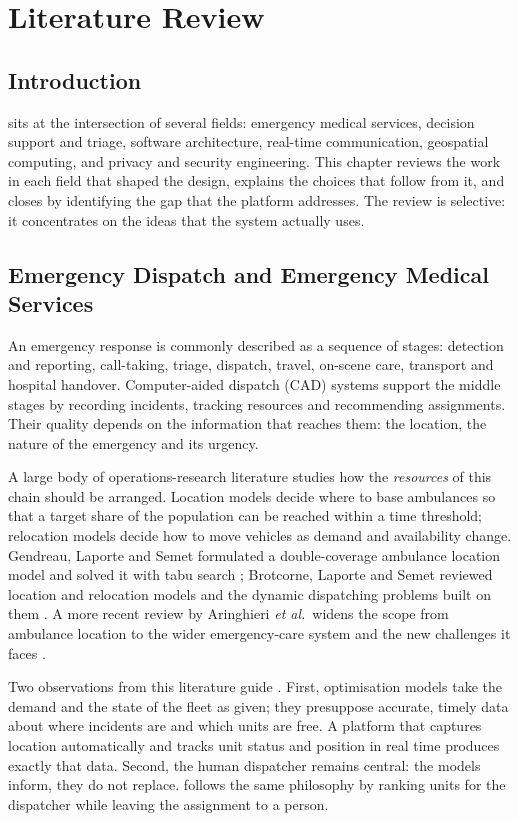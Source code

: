 \chapter{Literature Review}\label{chap:literature}

\section{Introduction}

\ProjectName{} sits at the intersection of several fields: emergency medical services, decision support and
triage, software architecture, real-time communication, geospatial computing, and privacy and security
engineering. This chapter reviews the work in each field that shaped the design, explains the choices that follow
from it, and closes by identifying the gap that the platform addresses. The review is selective: it concentrates
on the ideas that the system actually uses.

\section{Emergency Dispatch and Emergency Medical Services}

An emergency response is commonly described as a sequence of stages: detection and reporting, call-taking,
triage, dispatch, travel, on-scene care, transport and hospital handover. Computer-aided dispatch (CAD) systems
support the middle stages by recording incidents, tracking resources and recommending assignments. Their
quality depends on the information that reaches them: the location, the nature of the emergency and its urgency.

A large body of operations-research literature studies how the \emph{resources} of this chain should be
arranged. Location models decide where to base ambulances so that a target share of the population can be
reached within a time threshold; relocation models decide how to move vehicles as demand and availability change.
Gendreau, Laporte and Semet formulated a double-coverage ambulance location model and solved it with tabu search
\cite{gendreau1997tabu}; Brotcorne, Laporte and Semet reviewed location and relocation models and the dynamic
dispatching problems built on them \cite{brotcorne2003ambulance}. A more recent review by Aringhieri
\emph{et al.}\ widens the scope from ambulance location to the wider emergency-care system and the new
challenges it faces \cite{aringhieri2017ems}.

Two observations from this literature guide \ProjectName{}. First, optimisation models take the demand and the
state of the fleet as given; they presuppose accurate, timely data about where incidents are and which units are
free. A platform that captures location automatically and tracks unit status and position in real time produces
exactly that data. Second, the human dispatcher remains central: the models inform, they do not replace. \ProjectName{}
follows the same philosophy by ranking units for the dispatcher while leaving the assignment to a person.

